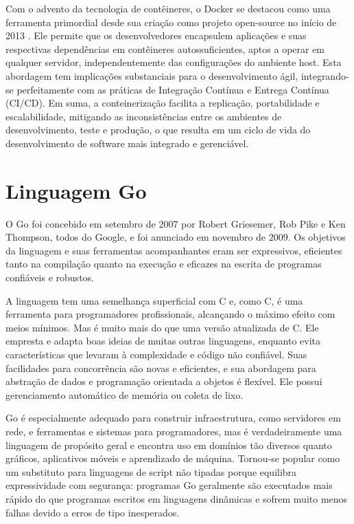 \documentclass[12pt, %
openright, 
oneside, %
a4paper,    %
brazil]{facom-ufu-abntex2}
\begin{document}
Com o advento da tecnologia de contêineres, o Docker se destacou como uma
ferramenta primordial desde sua criação como projeto open-source no início de
2013 \cite{merkel2014}. Ele permite que os desenvolvedores encapsulem
aplicações e suas respectivas dependências em contêineres autossuficientes,
aptos a operar em qualquer servidor, independentemente das configurações do
ambiente host. Esta abordagem tem implicações substanciais para o
desenvolvimento ágil, integrando-se perfeitamente com as práticas de Integração
Contínua e Entrega Contínua (CI/CD). Em suma, a conteinerização facilita a
replicação, portabilidade e escalabilidade, mitigando as inconsistências entre
os ambientes de desenvolvimento, teste e produção, o que resulta em um ciclo de
vida do desenvolvimento de software mais integrado e gerenciável.

\section{Linguagem Go}

O Go foi concebido em setembro de 2007 por Robert Griesemer, Rob Pike e Ken
Thompson, todos do Google, e foi anunciado em novembro de 2009. Os objetivos da
linguagem e suas ferramentas acompanhantes eram ser expressivos, eficientes
tanto na compilação quanto na execução e eficazes na escrita de programas
confiáveis e robustos.

A linguagem tem uma semelhança superficial com C e, como C, é uma ferramenta
para programadores profissionais, alcançando o máximo efeito com meios mínimos.
Mas é muito mais do que uma versão atualizada de C. Ele empresta e adapta boas
ideias de muitas outras linguagens, enquanto evita características que levaram
à complexidade e código não confiável. Suas facilidades para concorrência são
novas e eficientes, e sua abordagem para abstração de dados e programação
orientada a objetos é flexível. Ele possui gerenciamento automático de memória
ou coleta de lixo.

Go é especialmente adequado para construir infraestrutura, como servidores em
rede, e ferramentas e sistemas para programadores, mas é verdadeiramente uma
linguagem de propósito geral e encontra uso em domínios tão diversos quanto
gráficos, aplicativos móveis e aprendizado de máquina. Tornou-se popular como
um substituto para linguagens de script não tipadas porque equilibra
expressividade com segurança: programas Go geralmente são executados mais
rápido do que programas escritos em linguagens dinâmicas e sofrem muito menos
falhas devido a erros de tipo inesperados.
\end{document}
